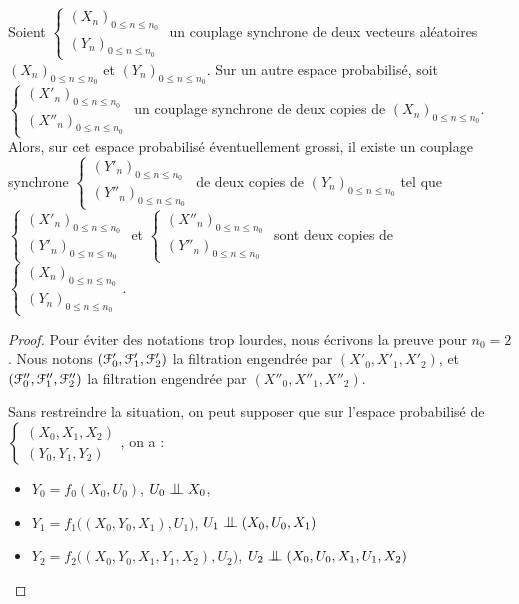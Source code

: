 \documentclass[12pt,a4paper]{article}
\begin{document}
\begin{appendices}
\begin{lemme}\label{lemme:quadricoimm}
Soient 
$\left\{\begin{smallmatrix} {(X_n)}_{0 \leq n \leq n_0} \\ 
{(Y_n)}_{0 \leq n \leq n_0}
\end{smallmatrix}\right.$  
un couplage synchrone de 
deux vecteurs aléatoires ${(X_n)}_{0 \leq n \leq n_0}$ et ${(Y_n)}_{0 \leq n \leq n_0}$. 
Sur un autre espace probabilisé, soit 
$\left\{\begin{smallmatrix} {(X'_n)}_{0 \leq n \leq n_0} \\ 
{(X''_n)}_{0 \leq n \leq n_0}
\end{smallmatrix}\right.$
un couplage synchrone de deux copies 
de ${(X_n)}_{0 \leq n \leq n_0}$. 
Alors, sur cet espace probabilisé éventuellement grossi, il 
existe un couplage synchrone 
$\left\{\begin{smallmatrix} {(Y'_n)}_{0 \leq n \leq n_0} \\ 
{(Y''_n)}_{0 \leq n \leq n_0}
\end{smallmatrix}\right.$
de deux copies de ${(Y_n)}_{0 \leq n \leq n_0}$ 
 tel que 
$\left\{\begin{smallmatrix} {(X'_n)}_{0 \leq n \leq n_0} \\ 
{(Y'_n)}_{0 \leq n \leq n_0}
\end{smallmatrix}\right.$ et
$\left\{\begin{smallmatrix} {(X''_n)}_{0 \leq n \leq n_0} \\ 
{(Y''_n)}_{0 \leq n \leq n_0}
\end{smallmatrix}\right.$
sont deux copies de 
$\left\{\begin{smallmatrix} {(X_n)}_{0 \leq n \leq n_0} \\ 
{(Y_n)}_{0 \leq n \leq n_0}
\end{smallmatrix}\right.$.
\end{lemme}

\begin{proof}
Pour éviter des notations trop lourdes, nous écrivons la preuve pour $n_0=2$. 
Nous notons $(\EuScript{F}'_0, \EuScript{F}'_1, \EuScript{F}'_2)$ la filtration engendrée par $(X'_0, X'_1, X'_2)$, 
et $(\EuScript{F}''_0, \EuScript{F}''_1, \EuScript{F}''_2)$ la filtration engendrée par $(X''_0, X''_1, X''_2)$.

Sans restreindre la situation, on peut supposer que sur l'espace probabilisé de 
$\left\{\begin{smallmatrix} (X_0, X_1, X_2) \\ 
(Y_0, Y_1, Y_2)
\end{smallmatrix}\right.$, on a :
\begin{itemize}
\item $Y_0 = f_0(X_0, U_0)$, $U_0 \indep X_0$,
\item $Y_1 = f_1\bigl((X_0, Y_0, X_1), U_1\bigr)$, $U_1 \indep (X_0, U_0, X_1)$
\item $Y_2 = f_2\bigl((X_0, Y_0, X_1, Y_1, X_2), U_2\bigr)$, $U_2 \indep (X_0, U_0, X_1, U_1, X_2)$
\end{itemize} 


\end{proof}
\end{appendices}
\end{document}
